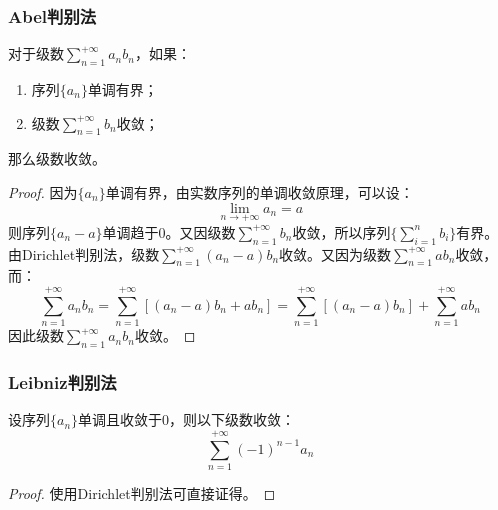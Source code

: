 \subsubsection{Abel判别法}
\begin{theorem}
	对于级数$\sum\limits_{n=1}^{+\infty}a_nb_n$，如果：
	\begin{enumerate}
		\item 序列$\{a_n\}$单调有界；
		\item 级数$\sum\limits_{n=1}^{+\infty}b_n$收敛；
	\end{enumerate}
	那么级数收敛。
\end{theorem}
\begin{proof}
	因为$\{a_n\}$单调有界，由实数序列的单调收敛原理，可以设：
	\begin{equation*}
		\lim_{n\to+\infty}a_n=a
	\end{equation*}
	则序列$\{a_n-a\}$单调趋于$0$。又因级数$\sum\limits_{n=1}^{+\infty}b_n$收敛，所以序列$\{\sum\limits_{i=1}^nb_i\}$有界。由Dirichlet判别法，级数$\sum\limits_{n=1}^{+\infty}(a_n-a)b_n$收敛。又因为级数$\sum\limits_{n=1}^{+\infty}ab_n$收敛，而：
	\begin{equation*}
		\sum_{n=1}^{+\infty}a_nb_n=\sum_{n=1}^{+\infty}\left[(a_n-a)b_n+ab_n\right]=\sum_{n=1}^{+\infty}\left[(a_n-a)b_n\right]+\sum_{n=1}^{+\infty}ab_n
	\end{equation*}
	因此级数$\sum\limits_{n=1}^{+\infty}a_nb_n$收敛。
\end{proof}

\subsubsection{Leibniz判别法}
\begin{theorem}
	设序列$\{a_n\}$单调且收敛于$0$，则以下级数收敛：
	\begin{equation*}
		\sum_{n=1}^{+\infty}(-1)^{n-1}a_n
	\end{equation*}
\end{theorem}
\begin{proof}
	使用Dirichlet判别法可直接证得。
\end{proof}


























